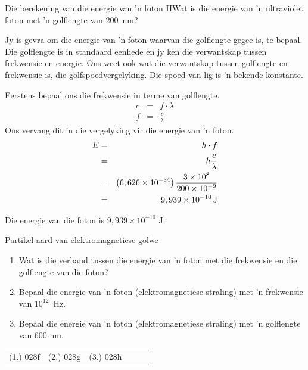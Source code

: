 \begin{wex}{Die berekening van die energie van 'n foton II}{Wat is die energie van 'n ultraviolet foton met 'n golflengte van 200~nm?}{
Jy is gevra om die energie van 'n foton waarvan die golflengte gegee is, te bepaal. Die golflengte is in standaard eenhede en jy ken die verwantskap tussen frekwensie en energie. Ons weet ook wat die verwantskap tussen golflengte en frekwensie is, die golfspoedvergelyking. Die spoed van lig is 'n bekende konstante.

Eerstens bepaal ons die frekwensie in terme van golflengte.
\begin{eqnarray*}
c &=& f\cdot\lambda\\
f &=& \frac{c}{\lambda}
\end{eqnarray*}
Ons vervang dit in die vergelyking vir die energie van 'n foton. 
\begin{eqnarray*}
E&=& h \cdot f\\
& =& h\frac{c}{\lambda }\hfill \\ 
& =& \left(6,626\ensuremath{\times}{10}^{-34}\right)\frac{3\ensuremath{\times}{10}^{8}}{200\ensuremath{\times}{10}^{-9}}\hfill \\ 
& =& 9,939\ensuremath{\times}{10}^{-10}\phantom{\rule{0.166667em}{0ex}}\text{J}
\end{eqnarray*}

Die energie van die foton is $9,939\times10^{-10}$ J.
}
\end{wex}

\begin{exercises}{Partikel aard van e\-lek\-tro\-mag\-ne\-tie\-se golwe}
\begin{enumerate}[noitemsep, label=\textbf{\arabic*}. ]
    \item Wat is die verband tussen die energie van 'n foton met die frekwensie en die golflengte van die foton? \newline
    \item Bepaal die energie van 'n foton (e\-lek\-tro\-mag\-ne\-tie\-se straling) met 'n frekwensie van ${10}^{12}$~Hz.\newline
    \item Bepaal die energie van 'n foton (e\-lek\-tro\-mag\-ne\-tie\-se straling) met 'n golflengte van 600 nm.\newline
\end{enumerate}
  \label{m38778**end}
\practiceinfo
 \par \begin{tabular}[h]{cccccc}
 (1.) 028f  &  (2.) 028g  &  (3.) 028h  & \end{tabular}
\end{exercises}
            
